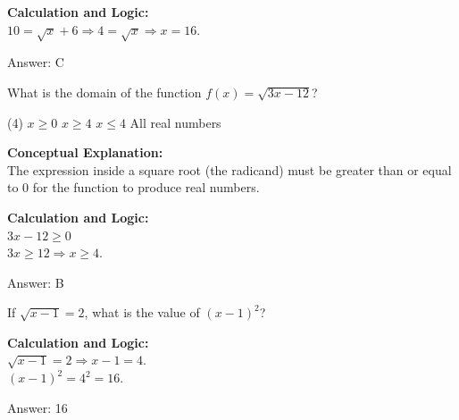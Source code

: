 \documentclass[11pt,paper=a4,answers]{exam}
\begin{document}
\begin{questions}
\begin{solution}
\textbf{Calculation and Logic:} \\
$10 = \sqrt{x} + 6 \Rightarrow 4 = \sqrt{x} \Rightarrow x = 16$.

\vspace{25pt}

Answer: \colorbox{yellow!100}{C}
\end{solution}

\vspace{40pt}

\question
What is the domain of the function $f(x) = \sqrt{3x - 12}$?
\begin{tasks}(4)
    \task $x \geq 0$
    \task $x \geq 4$
    \task $x \leq 4$
    \task All real numbers
\end{tasks}

\begin{solution}
\textbf{Conceptual Explanation:} \\
The expression inside a square root (the radicand) must be greater than or equal to 0 for the function to produce real numbers.

\vspace{20pt}

\textbf{Calculation and Logic:} \\
$3x - 12 \geq 0$ \\
$3x \geq 12 \Rightarrow x \geq 4$.

\vspace{25pt}

Answer: \colorbox{yellow!100}{B}
\end{solution}

\vspace{40pt}

\question
If $\sqrt{x-1} = 2$, what is the value of $(x-1)^2$?

\begin{solution}
\textbf{Calculation and Logic:} \\
$\sqrt{x-1} = 2 \Rightarrow x-1 = 4$. \\
$(x-1)^2 = 4^2 = 16$.

\vspace{25pt}

Answer: \colorbox{yellow!100}{16}
\end{solution}

\vspace{40pt}


\end{questions}
\end{document}
